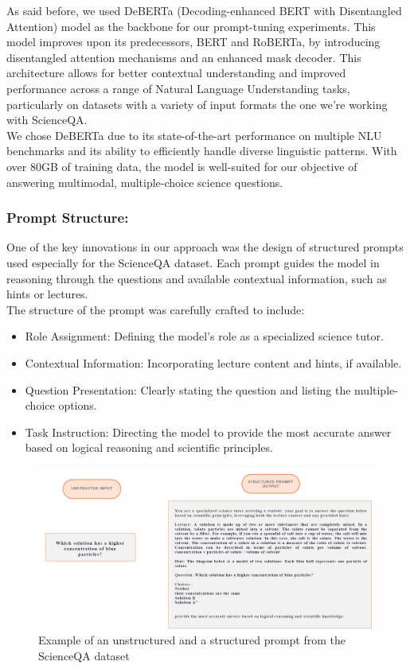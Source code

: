 \documentclass{article}
\begin{document}
As said before, we used DeBERTa (Decoding-enhanced BERT with Disentangled Attention) model as the backbone for our prompt-tuning experiments. This model improves upon its predecessors, BERT and RoBERTa, by introducing disentangled attention mechanisms and an enhanced mask decoder. This architecture allows for better contextual understanding and improved performance across a range of Natural Language Understanding tasks, particularly on datasets with a variety of input formats the one we're working with ScienceQA. \\
We chose DeBERTa due to its state-of-the-art performance on multiple NLU benchmarks and its ability to efficiently handle diverse linguistic patterns. With over 80GB of training data, the model is well-suited for our objective of answering multimodal, multiple-choice science questions.

\subsubsection{Prompt Structure:}

One of the key innovations in our approach was the design of structured prompts used especially for the ScienceQA dataset. Each prompt guides the model in reasoning through the questions and available contextual information, such as hints or lectures. \\
The structure of the prompt was carefully crafted to include:
\begin{itemize}
    \item Role Assignment: Defining the model's role as a specialized science tutor.
    \item Contextual Information: Incorporating lecture content and hints, if available.
    \item Question Presentation: Clearly stating the question and listing the multiple-choice options.
    \item Task Instruction: Directing the model to provide the most accurate answer based on logical reasoning and scientific principles.
\end{itemize}

\begin{figure}
  \centerline{\includegraphics[scale=0.2]{rapport/images/prompt.png}}
  \caption{Example of an unstructured and a structured prompt from the ScienceQA dataset}
  \label{fig:example_prompt}
\end{figure}
\end{document}

